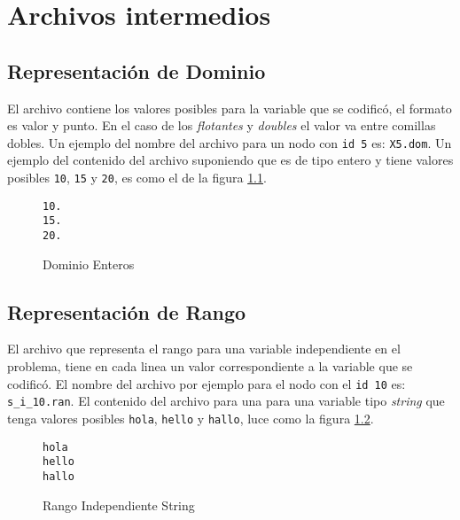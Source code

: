 \chapter{Archivos intermedios}

\section {Representación de Dominio}

\label{archivos_intermedios:dom}
El archivo contiene los valores posibles para la variable que se codificó, el formato es 
valor y punto. En el caso de los \textit{flotantes} y \textit{doubles} el valor va entre comillas dobles.
Un ejemplo del nombre del archivo para un nodo con \texttt{id 5} es: \texttt{X5.dom}.
Un ejemplo del contenido del archivo suponiendo que es de tipo entero y tiene valores 
posibles \texttt{10}, \texttt{15} y \texttt{20}, es como el de la figura \ref{fig:ej_dominio}.
\begin{figure}[h]
\begin{lstlisting}[mathescape]
10.
15.
20.
\end{lstlisting}
\caption[Dominio Enteros]
{Dominio Enteros}
\label{fig:ej_dominio}
\end{figure}

\section {Representación de Rango}

\label{archivos_intermedios:siran}
El archivo que representa el rango para una variable independiente en el problema, tiene
en cada linea un valor correspondiente a la variable que se codificó. El nombre del 
archivo por ejemplo para el nodo con el \texttt{id 10} es: \texttt{s\_i\_10.ran}. El contenido
del archivo para una para una variable tipo \emph{string} que tenga valores posibles \texttt{hola},
\texttt{hello} y \texttt{hallo}, luce como la figura \ref{fig:ej_si}.

\begin{figure}[h]
\begin{lstlisting}[mathescape]
hola
hello
hallo
\end{lstlisting}
\caption[Rango Independiente String]
{Rango Independiente String}
\label{fig:ej_si}
\end{figure}

